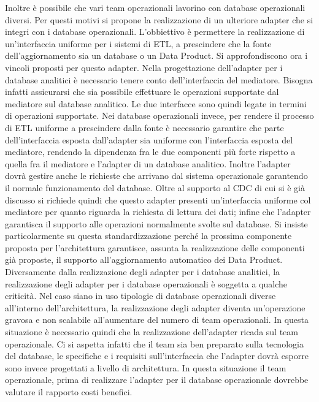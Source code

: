 \documentclass[12pt]{report}
\begin{document}
Inoltre è possibile che vari team operazionali lavorino con database operazionali diversi. 
Per questi motivi si propone la realizzazione di un ulteriore  adapter che si integri con i database operazionali.
L'obbiettivo è permettere la realizzazione di un'interfaccia uniforme per i sistemi di ETL, a prescindere che la fonte dell'aggiornamento sia un database o un Data Product.
Si approfondiscono ora i vincoli proposti per questo adapter.
Nella progettazione dell'adapter per i database analitici è necessario tenere conto dell'interfaccia del mediatore. 
Bisogna infatti assicurarsi che sia possibile effettuare le operazioni supportate dal mediatore sul database analitico.
Le due interfacce sono quindi legate in termini di operazioni supportate.
Nei database operazionali invece, per rendere il processo di ETL uniforme a prescindere dalla fonte è necessario garantire che parte dell'interfaccia esposta dall'adapter sia uniforme con l'interfaccia esposta del mediatore, rendendo la dipendenza fra le due componenti più forte rispetto a quella fra il mediatore e l'adapter di un database analitico.
Inoltre l'adapter dovrà gestire anche le richieste che arrivano dal sistema operazionale garantendo il normale funzionamento del database.
Oltre al supporto al CDC di cui si è già discusso si richiede quindi che questo adapter presenti un'interfaccia uniforme col mediatore per quanto riguarda la richiesta di lettura dei dati; infine che l'adapter garantisca il supporto alle operazioni normalmente svolte sul database.
Si insiste particolarmente su questa standardizzazione perché la prossima componente proposta per l'architettura garantisce, assunta la realizzazione delle componenti già proposte, il supporto all'aggiornamento automatico dei Data Product.
Diversamente dalla realizzazione degli adapter per i database analitici, la realizzazione degli adapter per i database operazionali è soggetta a qualche criticità.
Nel caso siano in uso tipologie di database operazionali diverse all'interno dell'architettura, la realizzazione degli adapter diventa un'operazione gravosa e non scalabile all'aumentare del numero di team operazionali.
In questa situazione è necessario quindi che la realizzazione dell'adapter ricada sul team operazionale.
Ci si aspetta infatti che il team sia ben preparato sulla tecnologia del database, le specifiche e i requisiti sull'interfaccia che l'adapter dovrà esporre sono invece progettati a livello di architettura.
In questa situazione il team operazionale, prima di realizzare l'adapter per il database operazionale dovrebbe valutare il rapporto costi benefici.
\end{document}
